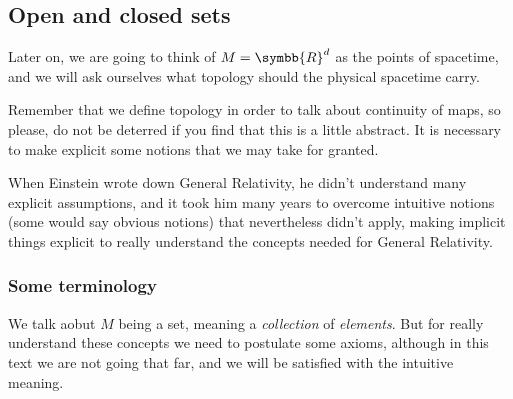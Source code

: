 \subsection{Open and closed sets}
Later on, we are going to think of $M = \symbb{R}^d$ as the points of spacetime, and we
will ask ourselves what topology should the physical spacetime carry.

Remember that we define topology in order to talk about continuity of maps, so please,
do not be deterred if you find that this is a little abstract. It is necessary to make
explicit some notions that we may take for granted.

When Einstein wrote down General Relativity, he didn't understand many explicit
assumptions, and it took him many years to overcome intuitive notions (some would say
obvious notions) that nevertheless didn't apply, making implicit things explicit to
really understand the concepts needed for General Relativity.

\subsubsection{Some terminology}
We talk aobut $M$ being a set, meaning a \emph{collection} of \emph{elements}. But for
really understand these concepts we need to postulate some axioms, although in this text
we are not going that far, and we will be satisfied with the intuitive meaning.

